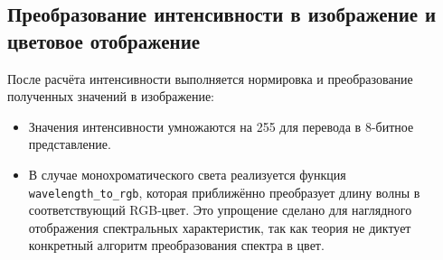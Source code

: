 \documentclass[a4paper,11pt]{article}
\theoremstyle{definition}
\begin{document}
    \subsection{Преобразование интенсивности в изображение и цветовое отображение}
    После расчёта интенсивности выполняется нормировка и преобразование полученных значений в изображение:
    \begin{itemize}
        \item Значения интенсивности умножаются на 255 для перевода в 8-битное представление.
        \item В случае монохроматического света реализуется функция \texttt{wavelength\_to\_rgb},
        которая приближённо преобразует длину волны в соответствующий RGB-цвет. Это упрощение сделано
        для наглядного отображения спектральных характеристик, так как теория не диктует конкретный
        алгоритм преобразования спектра в цвет.
    \end{itemize}
    
\end{document}
